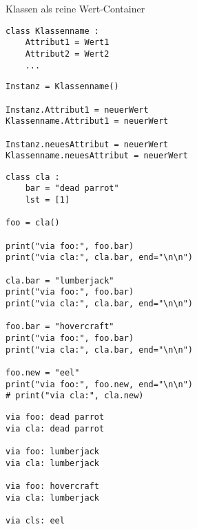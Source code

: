 \begin{frame}[fragile]{Klassen als reine Wert-Container}
%
\begin{codebox}
\begin{verbatim}
class Klassenname :
    Attribut1 = Wert1
    Attribut2 = Wert2
    ...
\end{verbatim}
\end{codebox}
%
\begin{codebox}
\begin{verbatim}
Instanz = Klassenname()

Instanz.Attribut1 = neuerWert
Klassenname.Attribut1 = neuerWert

Instanz.neuesAttribut = neuerWert
Klassenname.neuesAttribut = neuerWert
\end{verbatim}
\end{codebox}
%
\end{frame}


\begin{frame}[fragile]
%
\begin{tcbraster}[raster columns=2,
                  raster equal height,
                  nobeforeafter,
                  raster column skip=0.5cm]
\begin{codebox}
\begin{verbatim}
class cla :
    bar = "dead parrot"
    lst = [1]

foo = cla()

print("via foo:", foo.bar)
print("via cla:", cla.bar, end="\n\n")

cla.bar = "lumberjack"
print("via foo:", foo.bar)
print("via cla:", cla.bar, end="\n\n")

foo.bar = "hovercraft"
print("via foo:", foo.bar)
print("via cla:", cla.bar, end="\n\n")

foo.new = "eel"
print("via foo:", foo.new, end="\n\n")
# print("via cla:", cla.new)
\end{verbatim}
\end{codebox}
%
\begin{cmdbox}
\begin{verbatim}
via foo: dead parrot
via cla: dead parrot

via foo: lumberjack
via cla: lumberjack

via foo: hovercraft
via cla: lumberjack

via cls: eel
\end{verbatim}
\end{cmdbox}
\end{tcbraster}
%
\end{frame}

